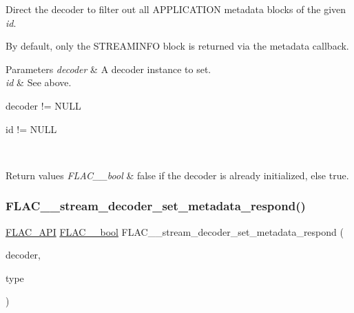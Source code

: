 Direct the decoder to filter out all A\+P\+P\+L\+I\+C\+A\+T\+I\+ON metadata blocks of the given {\itshape id}.

By default, only the {\ttfamily S\+T\+R\+E\+A\+M\+I\+N\+FO} block is returned via the metadata callback. 
\begin{DoxyParams}{Parameters}
{\em decoder} & A decoder instance to set. \\
\hline
{\em id} & See above.  
\begin{DoxyCode}
decoder != NULL 
\end{DoxyCode}
 
\begin{DoxyCode}
\textcolor{keywordtype}{id} != NULL 
\end{DoxyCode}
 \\
\hline
\end{DoxyParams}

\begin{DoxyRetVals}{Return values}
{\em F\+L\+A\+C\+\_\+\+\_\+bool} & {\ttfamily false} if the decoder is already initialized, else {\ttfamily true}. \\
\hline
\end{DoxyRetVals}
\mbox{\label{group__flac__stream__decoder_ga1644555cae7c54215c39bb4971100728}} 
\subsubsection{\texorpdfstring{F\+L\+A\+C\+\_\+\+\_\+stream\+\_\+decoder\+\_\+set\+\_\+metadata\+\_\+respond()}{FLAC\_\_stream\_decoder\_set\_metadata\_respond()}}
{\footnotesize\ttfamily \hyperlink{group__flac__export_ga56ca07df8a23310707732b1c0007d6f5}{F\+L\+A\+C\+\_\+\+A\+PI} \hyperlink{ordinals_8h_a95103469f1cbd78b8cf250194985b34e}{F\+L\+A\+C\+\_\+\+\_\+bool} F\+L\+A\+C\+\_\+\+\_\+stream\+\_\+decoder\+\_\+set\+\_\+metadata\+\_\+respond (\begin{DoxyParamCaption}\item[{\hyperlink{struct_f_l_a_c_____stream_decoder}{F\+L\+A\+C\+\_\+\+\_\+\+Stream\+Decoder} $\ast$}]{decoder,  }\item[{\hyperlink{group__flac__format_gac71714ba8ddbbd66d26bb78a427fac01}{F\+L\+A\+C\+\_\+\+\_\+\+Metadata\+Type}}]{type }\end{DoxyParamCaption})}

